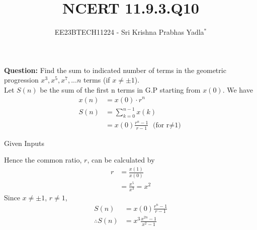 \documentclass[journal,12pt,twocolumn]{IEEEtran}
\theoremstyle{remark}
\begin{document}

\vspace{3cm}

\title{NCERT 11.9.3.Q10}
\author{EE23BTECH11224 - Sri Krishna Prabhas Yadla$^{*}$%
}
\maketitle
\newpage
\bigskip

\renewcommand{\thefigure}{\theenumi}
\renewcommand{\thetable}{\theenumi}


\vspace{3cm}
\textbf{Question:} Find the sum to indicated number of terms in the geometric progression \(x^3,x^5,x^7,...n\) terms (if \(x\neq\pm1\)).
\\
\solution
Let $S(n)$ be the sum of the first n terms in G.P starting from $x(0)$. We have
\begin{align}
    x(n) &= x(0) \cdot r^n \\
    S(n) &= \sum_{k=0}^{n-1}x(k) \\
    &= x(0) \frac{r^n-1}{r-1} \text{    (for r$\neq$1)}
\end{align}
\begin{table}[h]
    
    \label{tab:table1}
    \caption{Given Inputs}
\end{table}
\newline
Hence the common ratio, $r$, can be calculated by
\begin{align}
    r &= \frac{x(1)}{x(0)} \\
    &= \frac{x^5}{x^3} = x^2 
\end{align}
Since $x\neq\pm1$, $r\neq1$,
\begin{align}
    S(n) &= x(0) \frac{r^n-1}{r-1} \\
   \therefore S(n) &= x^3 \frac{x^{2n}-1}{x^2-1}
\end{align}
\end{document}
